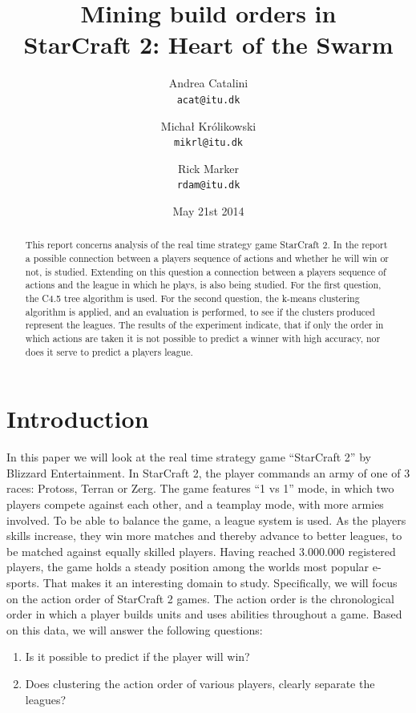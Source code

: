 \documentclass[a4paper,11pt]{article}
\begin{document}
\graphicspath{ {./images/} }
\date{May 21st 2014}
\title{Mining build orders in\\StarCraft 2: Heart of the Swarm}

\author{Andrea Catalini\\
\texttt{acat@itu.dk}
\and Michał Królikowski\\
\texttt{mikrl@itu.dk}
\and Rick Marker\\
\texttt{rdam@itu.dk}}

\clearpage\maketitle
\thispagestyle{empty}
\setcounter{page}{1}
\begin{abstract}
This report concerns analysis of the real time strategy game StarCraft 2. In the report a possible connection between a players sequence of actions and whether he will win or not, is studied. Extending on this question a connection between a players sequence of actions and the league in which he plays, is also being studied. 
For the first question, the C4.5 tree algorithm is used. For the second question, the k-means clustering algorithm is applied, and  an evaluation is performed, to see if the clusters produced represent the leagues.
The results of the experiment indicate, that if only the order in which actions are taken it is not possible to predict a winner with high accuracy, nor does it serve to predict a players league.
\end{abstract}


\section{Introduction}
In this paper we will look at the real time strategy game “StarCraft 2” by Blizzard Entertainment. 
In StarCraft 2, the player commands an army of one of 3 races: Protoss, Terran or Zerg. The game features “1 vs 1” mode, in which two players compete against each other, and a teamplay mode, with more armies involved.
To be able to balance the game, a league system is used. As the players skills increase, they win more matches and thereby advance to better leagues, to be matched against equally skilled players.
Having reached 3.000.000 registered players, the game holds a steady position among the worlds most popular e-sports. That makes it an interesting domain to study.
Specifically, we will focus on the action order of StarCraft 2 games. The action order is the chronological order in which a player builds units and uses abilities throughout a game. Based on this data, we will answer the following questions:
\begin{enumerate}
\item Is it possible to predict if the player will win?\label{q:win}
\item Does clustering the action order of various players, clearly separate the leagues?\label{q:league}
\end{enumerate}
\end{document}
